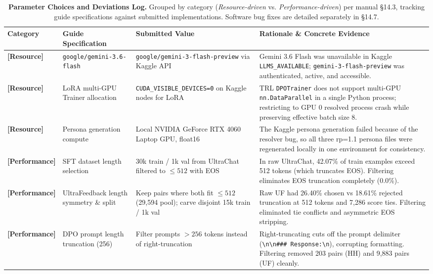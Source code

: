 \begin{table}[t]
\centering
\small
\caption{\textbf{Parameter Choices and Deviations Log.} Grouped by category (\textit{Resource-driven} vs. \textit{Performance-driven}) per manual \S14.3, tracking guide specifications against submitted implementations. Software bug fixes are detailed separately in \S14.7.}
\label{tab:deviations}
\begin{tabularx}{\textwidth}{lp{3.4cm}p{4.2cm}X}
\toprule
\textbf{Category} & \textbf{Guide Specification} & \textbf{Submitted Value} & \textbf{Rationale \& Concrete Evidence} \\
\midrule
\textbf{[Resource]} & \texttt{google/gemini-3.6-flash} & \texttt{google/gemini-3-flash-preview} via Kaggle API & Gemini 3.6 Flash was unavailable in Kaggle \texttt{LLMS\_AVAILABLE}; \texttt{gemini-3-flash-preview} was authenticated, active, and accessible. \\
\textbf{[Resource]} & LoRA multi-GPU Trainer allocation & \texttt{CUDA\_VISIBLE\_DEVICES=0} on Kaggle nodes for LoRA & TRL \texttt{DPOTrainer} does not support multi-GPU \texttt{nn.DataParallel} in a single Python process; restricting to GPU 0 resolved process crash while preserving effective batch size 8. \\
\textbf{[Resource]} & Persona generation compute & Local NVIDIA GeForce RTX 4060 Laptop GPU, float16 & The Kaggle persona generation failed because of the resolver bug, so all three rp=1.1 persona files were regenerated locally in one environment for consistency. \\
\midrule
\textbf{[Performance]} & SFT dataset length selection & 30k train / 1k val from UltraChat filtered to $\le 512$ with EOS & In raw UltraChat, 42.07\% of train examples exceed 512 tokens (which truncates EOS). Filtering eliminates EOS truncation completely (0.0\%). \\
\textbf{[Performance]} & UltraFeedback length symmetry \& split & Keep pairs where both fit $\le 512$ (29,594 pool); carve disjoint 15k train / 1k val & Raw UF had 26.40\% chosen vs 18.61\% rejected truncation at 512 tokens and 7,286 score ties. Filtering eliminated tie conflicts and asymmetric EOS stripping. \\
\textbf{[Performance]} & DPO prompt length truncation (256) & Filter prompts $> 256$ tokens instead of right-truncation & Right-truncating cuts off the prompt delimiter (\texttt{\textbackslash n\textbackslash n\#\#\# Response:\textbackslash n}), corrupting formatting. Filtering removed 203 pairs (HH) and 9,883 pairs (UF) cleanly. \\

\end{tabularx}
\end{table}
